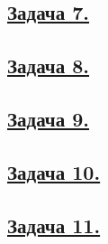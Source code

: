 \subsection*{\hyperref[sec:problem7]{Задача 7.}}\label{sec:sol_problem7}

\subsection*{\hyperref[sec:problem8]{Задача 8.}}\label{sec:sol_problem8}

\subsection*{\hyperref[sec:problem9]{Задача 9.}}\label{sec:sol_problem9}

\subsection*{\hyperref[sec:problem10]{Задача 10.}}\label{sec:sol_problem10}

\subsection*{\hyperref[sec:problem11]{Задача 11.}}\label{sec:sol_problem11}

